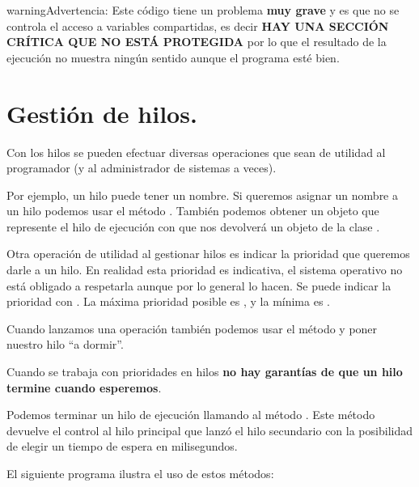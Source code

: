 \documentclass[a4paper,12pt,spanish]{sphinxmanual}
\begin{document}
\begin{notice}{warning}{Advertencia:}
Este código tiene un problema \textbf{muy grave} y es que no se controla el acceso a variables compartidas, es decir \textbf{HAY UNA SECCIÓN CRÍTICA QUE NO ESTÁ PROTEGIDA} por lo que el resultado de la ejecución no muestra ningún sentido aunque el programa esté bien.
\end{notice}


\section{Gestión de hilos.}
\label{textos/tema2:gestion-de-hilos}
Con los hilos se pueden efectuar diversas operaciones que sean de utilidad al programador (y al administrador de sistemas a veces).

Por ejemplo, un hilo puede tener un nombre. Si queremos asignar un nombre a un hilo podemos usar el método . También podemos obtener un objeto que represente el hilo de ejecución con  que nos devolverá un objeto de la clase .

Otra operación de utilidad al gestionar hilos es indicar la prioridad que queremos darle a un hilo. En realidad esta prioridad es indicativa, el sistema operativo no está obligado a respetarla aunque por lo general lo hacen. Se puede indicar la prioridad con . La máxima prioridad posible es , y la mínima es .

Cuando lanzamos una operación también podemos usar el método  y poner nuestro hilo ``a dormir''.

Cuando se trabaja con prioridades en hilos \textbf{no hay garantías de que un hilo termine cuando esperemos}.

Podemos terminar un hilo de ejecución llamando al método . Este método devuelve el control al hilo principal que lanzó el hilo secundario con la posibilidad de elegir un tiempo de espera en milisegundos.

El siguiente programa ilustra el uso de estos métodos:
\end{document}
